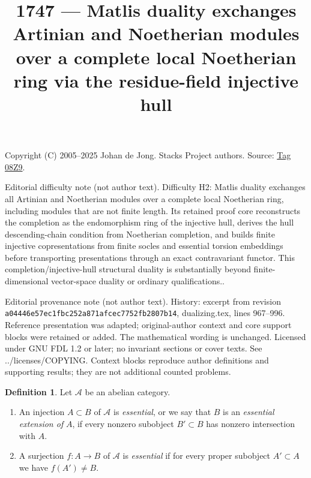 \documentclass{amsart}
\theoremstyle{plain}
\theoremstyle{definition}
\newtheorem{definition}[subsection]{Definition}
\theoremstyle{remark}
\numberwithin{equation}{subsection}
\begin{document}
\title[Stacks Project, Tag 08Z9]{1747 --- Matlis duality exchanges Artinian and Noetherian modules over a complete local Noetherian ring via the residue-field injective hull}
\maketitle
\noindent Copyright (C) 2005--2025 Johan de Jong. Stacks Project authors. Source: \href{https://stacks.math.columbia.edu/tag/08Z9}{Tag 08Z9}.

\noindent Editorial difficulty note (not author text). Difficulty H2: Matlis duality exchanges all Artinian and Noetherian modules over a complete local Noetherian ring, including modules that are not finite length. Its retained proof core reconstructs the completion as the endomorphism ring of the injective hull, derives the hull descending-chain condition from Noetherian completion, and builds finite injective copresentations from finite socles and essential torsion embeddings before transporting presentations through an exact contravariant functor. This completion/injective-hull structural duality is substantially beyond finite-dimensional vector-space duality or ordinary qualifications..

\noindent Editorial provenance note (not author text). History: excerpt from revision \texttt{a0444\allowbreak 6e57e\allowbreak c1fbc\allowbreak 252a8\allowbreak 71afc\allowbreak ec775\allowbreak 2fb28\allowbreak 07b14}, dualizing.tex, lines 967--996. Reference presentation was adapted; original-author context and core support blocks were retained or added. The mathematical wording is unchanged. Licensed under GNU FDL 1.2 or later; no invariant sections or cover texts. See ../licenses/COPYING. Context blocks reproduce author definitions and supporting results; they are not additional counted problems.

\begin{definition}
\label{definition-essential}
Let $\mathcal{A}$ be an abelian category.
\begin{enumerate}
\item An injection $A \subset B$ of $\mathcal{A}$ is {\it essential},
or we say that $B$ is an {\it essential extension of} $A$,
if every nonzero subobject $B' \subset B$ has nonzero intersection with $A$.
\item A surjection $f : A \to B$ of $\mathcal{A}$ is {\it essential}
if for every proper subobject $A' \subset A$ we have $f(A') \not = B$.
\end{enumerate}
\end{definition}
\end{document}
